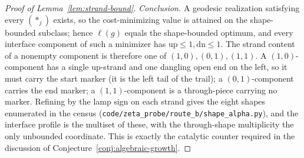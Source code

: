 \begin{proof}[Proof of Lemma~\ref{lem:strand-bound}]
\emph{Conclusion.}  A geodesic realization satisfying every $(\ast_j)$ exists,
so the cost-minimizing value is attained on the shape-bounded subclass; hence
$\ell(g)$ equals the shape-bounded optimum, and every interface component of
such a minimizer has $\mathrm{up}\le1,\mathrm{dn}\le1$.  The strand content of
a nonempty component is therefore one of $(1,0),(0,1),(1,1)$.  A
$(1,0)$-component has a single up-strand and one dangling open end on the
left, so it must carry the start marker (it is the left tail of the trail); a
$(0,1)$-component carries the end marker; a $(1,1)$-component is a
through-piece carrying no marker.  Refining by the lamp sign on each strand
gives the eight shapes enumerated in the census
(\texttt{code/zeta\_probe/route\_b/shape\_alpha.py}), and the interface
profile is the multiset of these, with the through-shape multiplicity the only
unbounded coordinate.  This is exactly the catalytic counter required in the
discussion of Conjecture~\ref{conj:algebraic-growth}.
\end{proof}

